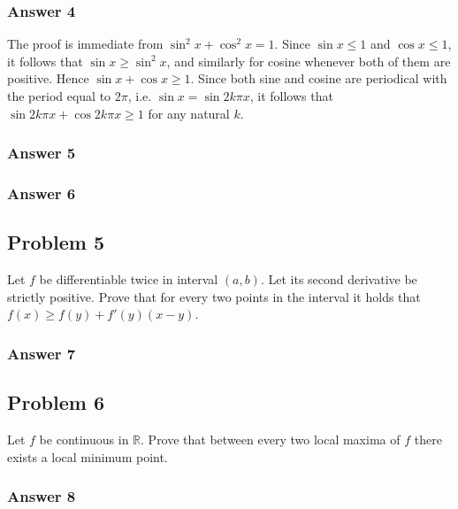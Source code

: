 \documentclass[a4paper]{article}
\begin{document}
\subsubsection{Answer 4}
\label{sec:orgheadline7}
The proof is immediate from \(\sin^2 x + \cos^2 x = 1\). Since \(\sin x \leq 1\)
and \(\cos x \leq 1\), it follows that \(\sin x \geq \sin^2 x\), and similarly
for cosine whenever both of them are positive.  Hence \(\sin x + \cos x \geq
    1\).  Since both sine and cosine are periodical with the period equal to
\(2\pi\), i.e. \(\sin x = \sin 2k\pi x\), it follows that \(\sin 2k\pi x + \cos
    2k\pi x \geq 1\) for any natural \(k\).

\subsubsection{Answer 5}
\label{sec:orgheadline8}

\subsubsection{Answer 6}
\label{sec:orgheadline9}

\subsection{Problem 5}
\label{sec:orgheadline12}
Let \(f\) be differentiable twice in interval \((a, b)\).  Let its second derivative
be strictly positive.  Prove that for every two points in the interval it holds
that \(f(x) \geq f(y) + f'(y)(x - y)\).

\subsubsection{Answer 7}
\label{sec:orgheadline11}

\subsection{Problem 6}
\label{sec:orgheadline14}
Let \(f\) be continuous in \(\mathbb{R}\).  Prove that between every two local maxima
of \(f\) there exists a local minimum point.

\subsubsection{Answer 8}
\label{sec:orgheadline13}
\end{document}
